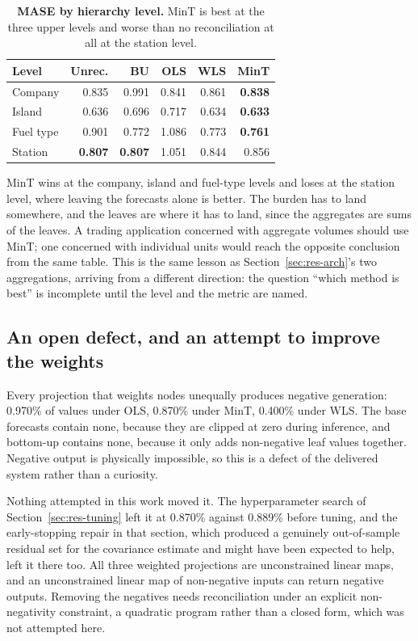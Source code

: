\begin{table}[htp]
\centering
\begin{tabular}{lrrrrr}
\toprule
{\bf Level} & {\bf Unrec.} & {\bf BU} & {\bf OLS} & {\bf WLS} & {\bf MinT} \\
\midrule
Company & 0.835 & 0.991 & 0.841 & 0.861 & {\bf 0.838} \\
Island & 0.636 & 0.696 & 0.717 & 0.634 & {\bf 0.633} \\
Fuel type & 0.901 & 0.772 & 1.086 & 0.773 & {\bf 0.761} \\
Station & {\bf 0.807} & {\bf 0.807} & 1.051 & 0.844 & 0.856 \\
\bottomrule
\end{tabular}
\caption[MASE by level]{\textbf{MASE by hierarchy level.} MinT is best at the three upper
levels and worse than no reconciliation at all at the station level.}
\label{tab:bylevel}
\end{table}

MinT wins at the company, island and fuel-type levels and loses at the station level, where
leaving the forecasts alone is better. The burden has to land somewhere, and the leaves are
where it has to land, since the aggregates are sums of the leaves. A trading application
concerned with aggregate volumes should use MinT; one concerned with individual units would
reach the opposite conclusion from the same table. This is the same lesson as
Section~\ref{sec:res-arch}'s two aggregations, arriving from a different direction: the
question ``which method is best'' is incomplete until the level and the metric are named.

\subsection{An open defect, and an attempt to improve the weights}

Every projection that weights nodes unequally produces negative generation: 0.970\% of
values under OLS, 0.870\% under MinT, 0.400\% under WLS. The base forecasts contain none,
because they are clipped at zero during inference, and bottom-up contains none, because it
only adds non-negative leaf values together. Negative output is physically impossible, so
this is a defect of the delivered system rather than a curiosity.

Nothing attempted in this work moved it. The hyperparameter search of
Section~\ref{sec:res-tuning} left it at 0.870\% against 0.889\% before tuning, and the
early-stopping repair in that section, which produced a genuinely out-of-sample residual set
for the covariance estimate and might have been expected to help, left it there too. All
three weighted projections are unconstrained linear maps, and an unconstrained linear map of
non-negative inputs can return negative outputs. Removing the negatives needs reconciliation
under an explicit non-negativity constraint, a quadratic program rather than a closed form,
which was not attempted here.

